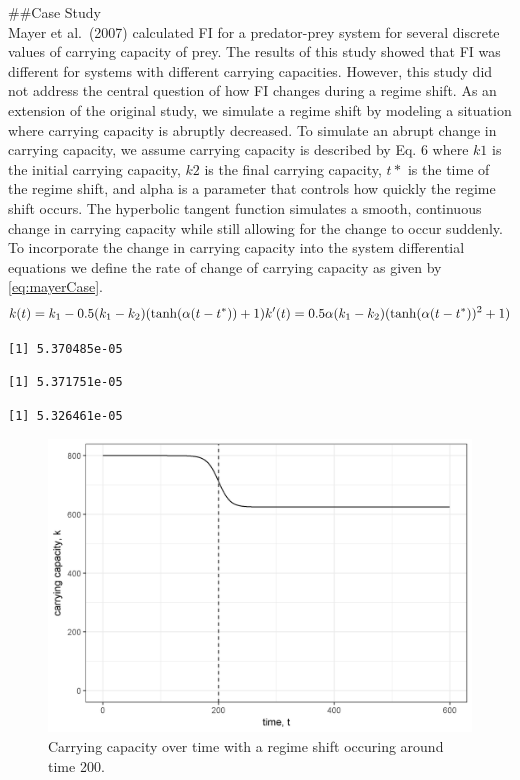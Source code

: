 \documentclass[12pt,twoside]{reedthesis}
\begin{document}
\#\#Case Study\\
Mayer et al.~(2007) calculated FI for a predator-prey system for several discrete values of carrying capacity of prey. The results of this study showed that FI was different for systems with different carrying capacities. However, this study did not address the central question of how FI changes during a regime shift. As an extension of the original study, we simulate a regime shift by modeling a situation where carrying capacity is abruptly decreased. To simulate an abrupt change in carrying capacity, we assume carrying capacity is described by Eq. 6 where \(k1\) is the initial carrying capacity, \(k2\) is the final carrying capacity, \(t*\) is the time of the regime shift, and alpha is a parameter that controls how quickly the regime shift occurs. The hyperbolic tangent function simulates a smooth, continuous change in carrying capacity while still allowing for the change to occur suddenly. To incorporate the change in carrying capacity into the system differential equations we define the rate of change of carrying capacity as given by \eqref{eq:mayerCase}.\\
\begin{equation}  
  k(t) = k_1  - 0.5(k_1-k_2)(\tanh(\alpha (t-t^*))+1)     \\
  k'(t) = 0.5\alpha (k_1-k_2)(\tanh(\alpha(t-t^*))^2 +1)      \\ 
\label{eq:mayerCase}
\end{equation}
\begin{verbatim}
[1] 5.370485e-05
\end{verbatim}
\begin{verbatim}
[1] 5.371751e-05
\end{verbatim}
\begin{verbatim}
[1] 5.326461e-05
\end{verbatim}
\begin{figure}

{\centering \includegraphics[width=1\linewidth]{./chapterFiles/fiGuide/figures/kByTime} 

}

\caption{Carrying capacity over time with a regime shift occuring around time 200.}\label{fig:kByTime}
\end{figure}
\end{document}

